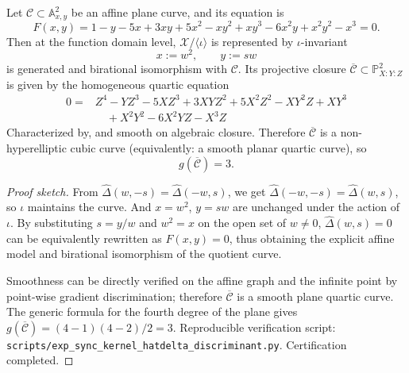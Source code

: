 \begin{proposition}\label{prop:sync-hatdelta-curve-quotient-plane-quartic-genus3}
Let \(\mathcal{C}\subset\mathbb{A}^2_{x,y}\) be an affine plane curve, and its equation is
\[
F(x,y)=1-y-5x+3xy+5x^2-xy^2+xy^3-6x^2y+x^2y^2-x^3=0.
\]
Then at the function domain level, \(\mathcal{X}/\langle\iota\rangle\) is represented by \(\iota\)-invariant
\[
x:=w^2,\qquad y:=sw
\]
is generated and birational isomorphism with \(\mathcal{C}\).
Its projective closure \(\overline{\mathcal{C}}\subset\mathbb{P}^2_{X:Y:Z}\) is given by the homogeneous quartic equation
\[
\begin{aligned}
0={}&Z^4-YZ^3-5XZ^3+3XYZ^2+5X^2Z^2-XY^2Z+XY^3\\
&\quad +X^2Y^2-6X^2YZ-X^3Z
\end{aligned}
\]
Characterized by, and smooth on algebraic closure.
Therefore \(\overline{\mathcal{C}}\) is a non-hyperelliptic cubic curve (equivalently: a smooth planar quartic curve), so
\[
g(\overline{\mathcal{C}})=3.
\]
\end{proposition}
\begin{proof}[Proof sketch]
From \(\widehat\Delta(w,-s)=\widehat\Delta(-w,s)\), we get \(\widehat\Delta(-w,-s)=\widehat\Delta(w,s)\), so \(\iota\) maintains the curve.
And \(x=w^2\), \(y=sw\) are unchanged under the action of \(\iota\).
By substituting \(s=y/w\) and \(w^2=x\) on the open set of \(w\neq 0\), \(\widehat\Delta(w,s)=0\) can be equivalently rewritten as \(F(x,y)=0\), thus obtaining the explicit affine model and birational isomorphism of the quotient curve.
\par
Smoothness can be directly verified on the affine graph and the infinite point by point-wise gradient discrimination; therefore \(\overline{\mathcal{C}}\) is a smooth plane quartic curve.
The generic formula for the fourth degree of the plane gives \(g(\overline{\mathcal{C}})=(4-1)(4-2)/2=3\).
Reproducible verification script: \texttt{scripts/exp\_sync\_kernel\_hatdelta\_discriminant.py}. Certification completed.
\end{proof}

